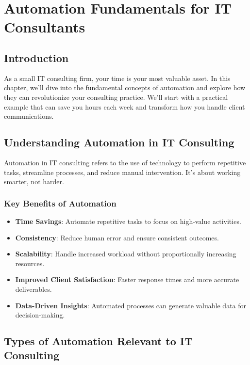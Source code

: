 \chapter{Automation Fundamentals for IT Consultants}

\section{Introduction}

As a small IT consulting firm, your time is your most valuable asset. In this chapter, we'll dive into the fundamental concepts of automation and explore how they can revolutionize your consulting practice. We'll start with a practical example that can save you hours each week and transform how you handle client communications.

\section{Understanding Automation in IT Consulting}

Automation in IT consulting refers to the use of technology to perform repetitive tasks, streamline processes, and reduce manual intervention. It's about working smarter, not harder.

\subsection{Key Benefits of Automation}

\begin{itemize}
    \item \textbf{Time Savings}: Automate repetitive tasks to focus on high-value activities.
    \item \textbf{Consistency}: Reduce human error and ensure consistent outcomes.
    \item \textbf{Scalability}: Handle increased workload without proportionally increasing resources.
    \item \textbf{Improved Client Satisfaction}: Faster response times and more accurate deliverables.
    \item \textbf{Data-Driven Insights}: Automated processes can generate valuable data for decision-making.
\end{itemize}


\section{Types of Automation Relevant to IT Consulting}

